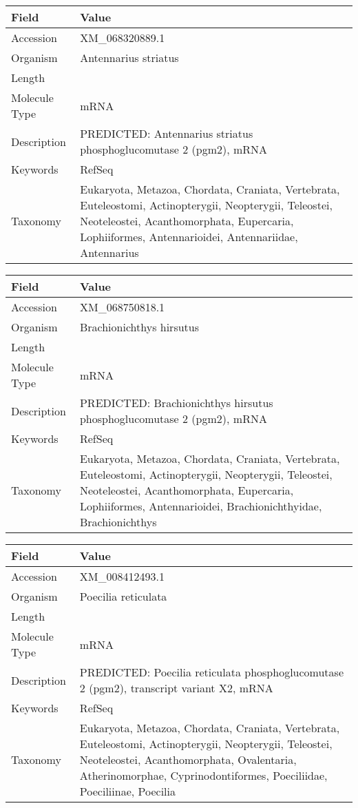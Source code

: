 \documentclass[10pt]{article}
\begin{document}
{\footnotesize
\begin{longtable}{>{\raggedright\arraybackslash}p{4.5cm} >{\raggedright\arraybackslash}p{11.5cm}}
\textbf{Field} & \textbf{Value} \\
\hline
Accession & XM\_068320889.1 \\
Organism & Antennarius striatus \\
Length & 2801 \\
Molecule Type & mRNA \\
Description & PREDICTED: Antennarius striatus phosphoglucomutase 2 (pgm2), mRNA \\
Keywords & RefSeq \\
Taxonomy & Eukaryota, Metazoa, Chordata, Craniata, Vertebrata, Euteleostomi, Actinopterygii, Neopterygii, Teleostei, Neoteleostei, Acanthomorphata, Eupercaria, Lophiiformes, Antennarioidei, Antennariidae, Antennarius \\
\end{longtable}
}

{\footnotesize
\begin{longtable}{>{\raggedright\arraybackslash}p{4.5cm} >{\raggedright\arraybackslash}p{11.5cm}}
\textbf{Field} & \textbf{Value} \\
\hline
Accession & XM\_068750818.1 \\
Organism & Brachionichthys hirsutus \\
Length & 2618 \\
Molecule Type & mRNA \\
Description & PREDICTED: Brachionichthys hirsutus phosphoglucomutase 2 (pgm2), mRNA \\
Keywords & RefSeq \\
Taxonomy & Eukaryota, Metazoa, Chordata, Craniata, Vertebrata, Euteleostomi, Actinopterygii, Neopterygii, Teleostei, Neoteleostei, Acanthomorphata, Eupercaria, Lophiiformes, Antennarioidei, Brachionichthyidae, Brachionichthys \\
\end{longtable}
}

{\footnotesize
\begin{longtable}{>{\raggedright\arraybackslash}p{4.5cm} >{\raggedright\arraybackslash}p{11.5cm}}
\textbf{Field} & \textbf{Value} \\
\hline
Accession & XM\_008412493.1 \\
Organism & Poecilia reticulata \\
Length & 3752 \\
Molecule Type & mRNA \\
Description & PREDICTED: Poecilia reticulata phosphoglucomutase 2 (pgm2), transcript variant X2, mRNA \\
Keywords & RefSeq \\
Taxonomy & Eukaryota, Metazoa, Chordata, Craniata, Vertebrata, Euteleostomi, Actinopterygii, Neopterygii, Teleostei, Neoteleostei, Acanthomorphata, Ovalentaria, Atherinomorphae, Cyprinodontiformes, Poeciliidae, Poeciliinae, Poecilia \\
\end{longtable}
}
\end{document}
